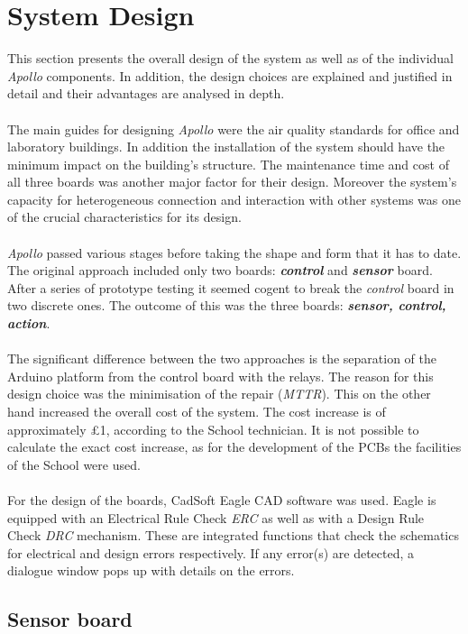 \documentclass[12pt,a4paper,draft]{report}
\begin{document}
\chapter{System Design}
This section presents the overall design of the system as well as of the individual \emph{Apollo} components.
In addition, the design choices are explained and justified in detail and their advantages are analysed in depth.\\
\ \\
The main guides for designing \emph{Apollo} were the air quality standards for office and laboratory buildings. In addition the installation of the system should have the minimum impact on the building's structure. The maintenance time and cost of all three boards was another major factor for their design. Moreover the system's capacity for heterogeneous connection and interaction with other systems was one of the crucial characteristics for its design. \\
\ \\
\emph{Apollo} passed various stages before taking the shape and form that it has to date.
The original approach included only two boards: \textbf{\textit{control}} and \textbf{\textit{sensor}} board.
After a series of prototype testing it seemed cogent to break the \textit{control} board in two discrete ones.
The outcome of this was the three boards: \textbf{\textit{sensor, control, action}}.\\
\ \\
The significant difference between the two approaches is the separation of the Arduino platform from the control board with the relays.
The reason for this design choice was the minimisation of the repair (\textit{MTTR}).
This on the other hand increased the overall cost of the system.
The cost increase is of approximately £1, according to the School technician.
It is not possible to calculate the exact cost increase, as for the development of the PCBs the facilities of the School were used.\\
\ \\
For the design of the boards, CadSoft Eagle CAD software was used. Eagle is equipped with an Electrical Rule Check \textit{ERC} as well as with a Design Rule Check \textit{DRC} mechanism.
These are integrated functions that check the schematics for electrical and design errors respectively.
If any error(s) are detected, a dialogue window pops up with details on the errors.
%
\section{Sensor board}
\end{document}
